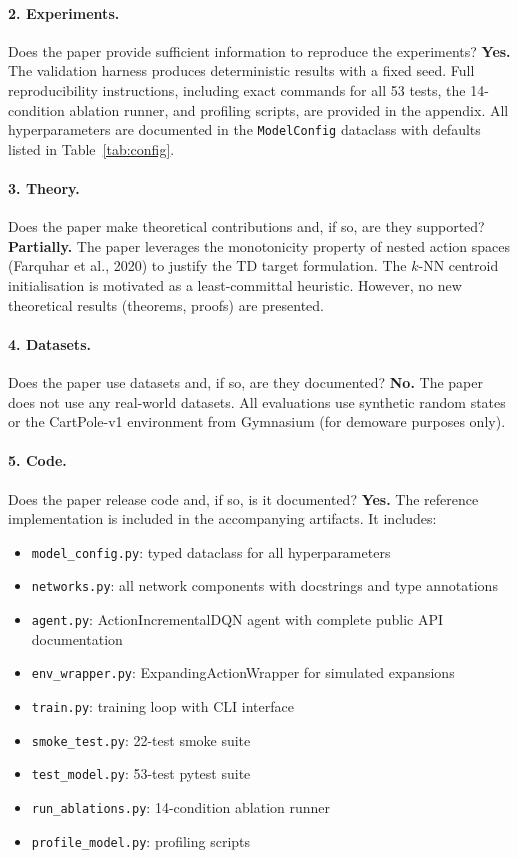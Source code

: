 \documentclass{article}
\begin{document}
\paragraph{2. Experiments.}
Does the paper provide sufficient information to reproduce the experiments?
\textbf{Yes.} The validation harness produces deterministic results with a fixed seed. Full reproducibility instructions, including exact commands for all 53 tests, the 14-condition ablation runner, and profiling scripts, are provided in the appendix. All hyperparameters are documented in the \texttt{ModelConfig} dataclass with defaults listed in Table~\ref{tab:config}.

\paragraph{3. Theory.}
Does the paper make theoretical contributions and, if so, are they supported?
\textbf{Partially.} The paper leverages the monotonicity property of nested action spaces (Farquhar et al., 2020) to justify the TD target formulation. The $k$-NN centroid initialisation is motivated as a least-committal heuristic. However, no new theoretical results (theorems, proofs) are presented.

\paragraph{4. Datasets.}
Does the paper use datasets and, if so, are they documented?
\textbf{No.} The paper does not use any real-world datasets. All evaluations use synthetic random states or the CartPole-v1 environment from Gymnasium (for demoware purposes only).

\paragraph{5. Code.}
Does the paper release code and, if so, is it documented?
\textbf{Yes.} The reference implementation is included in the accompanying artifacts. It includes:
\begin{itemize}
  \item \texttt{model\_config.py}: typed dataclass for all hyperparameters
  \item \texttt{networks.py}: all network components with docstrings and type annotations
  \item \texttt{agent.py}: ActionIncrementalDQN agent with complete public API documentation
  \item \texttt{env\_wrapper.py}: ExpandingActionWrapper for simulated expansions
  \item \texttt{train.py}: training loop with CLI interface
  \item \texttt{smoke\_test.py}: 22-test smoke suite
  \item \texttt{test\_model.py}: 53-test pytest suite
  \item \texttt{run\_ablations.py}: 14-condition ablation runner
  \item \texttt{profile\_model.py}: profiling scripts
\end{itemize}
\end{document}
